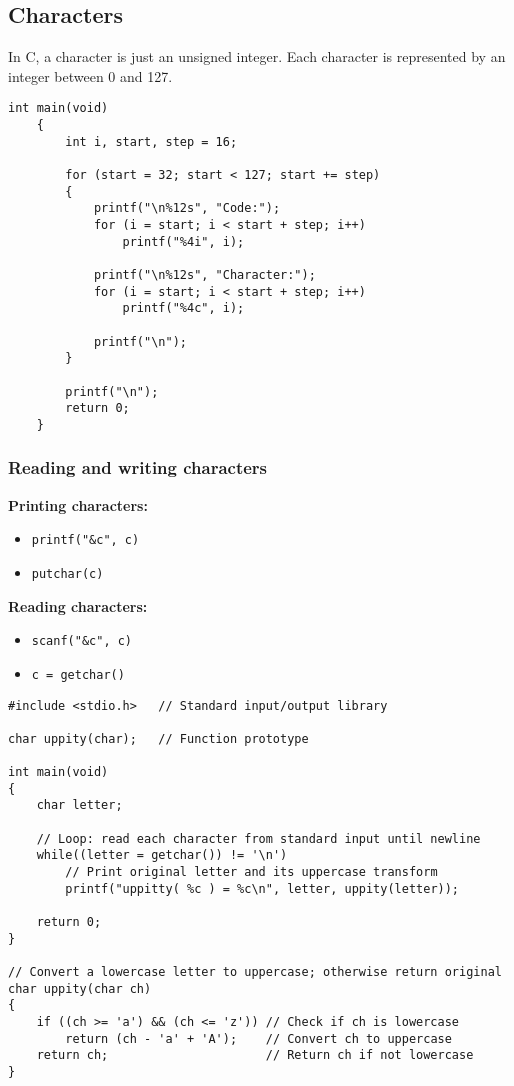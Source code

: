 \documentclass[a4paper, 10pt]{article}
\begin{document}
\subsection{Characters}
In C, a character is just an unsigned integer. Each character is represented by an integer between 0 and 127.
\begin{lstlisting}[style=cStyle, caption={Generate ASCII Characters}]
    int main(void)
    {
        int i, start, step = 16;

        for (start = 32; start < 127; start += step)
        {
            printf("\n%12s", "Code:");
            for (i = start; i < start + step; i++)
                printf("%4i", i);

            printf("\n%12s", "Character:");
            for (i = start; i < start + step; i++)
                printf("%4c", i);

            printf("\n");
        }

        printf("\n");
        return 0;
    }
\end{lstlisting}

\subsubsection{Reading and writing characters}
\begin{minipage}{0.45\textwidth}
    \textbf{Printing characters:}

    \begin{itemize}
        \item \texttt{printf("\&c", c)}
        \item \texttt{putchar(c)}
    \end{itemize}
\end{minipage}
\begin{minipage}{0.45\textwidth}
    \textbf{Reading characters:}
    \begin{itemize}
        \item \texttt{scanf("\&c", c)}
        \item \texttt{c = getchar()}
    \end{itemize}
\end{minipage}
\begin{lstlisting}[style=cStyle, caption={Conver lowercase to uppercase}]
#include <stdio.h>   // Standard input/output library

char uppity(char);   // Function prototype

int main(void)
{
    char letter;

    // Loop: read each character from standard input until newline
    while((letter = getchar()) != '\n')
        // Print original letter and its uppercase transform
        printf("uppitty( %c ) = %c\n", letter, uppity(letter));

    return 0;
}

// Convert a lowercase letter to uppercase; otherwise return original
char uppity(char ch)
{
    if ((ch >= 'a') && (ch <= 'z')) // Check if ch is lowercase
        return (ch - 'a' + 'A');    // Convert ch to uppercase
    return ch;                      // Return ch if not lowercase
}
\end{lstlisting}
\end{document}
